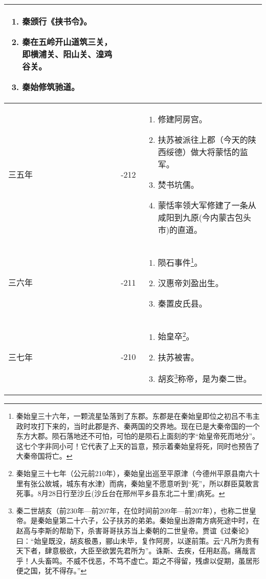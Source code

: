 \begin{longtable}{|>{\centering\scriptsize}m{2em}|>{\centering\scriptsize}m{1.3em}|>{\centering}m{8.8em}|}
\begin{enumerate}
  \item 秦颁行《挟书令》。
  \item 秦在五岭开山道筑三关，即横浦关、阳山关、湟鸡谷关。
  \item 秦始修筑驰道。
  \end{enumerate} \tabularnewline\hline
  三五年 & -212 & \begin{enumerate}
    \tiny
  \item 修建阿房宫。
  \item 扶苏被派往上郡（今天的陕西绥德）做大将蒙恬的监军。
  \item 焚书坑儒。
  \item 蒙恬率领大军修建了一条从咸阳到九原(今内蒙古包头市)的直道。
  \end{enumerate} \tabularnewline\hline
  三六年 & -211 & \begin{enumerate}
    \tiny
  \item 陨石事件\footnote{秦始皇三十六年，一颗流星坠落到了东郡。东郡是在秦始皇即位之初吕不韦主政时攻打下来的，当时此郡是齐、秦两国的交界地。现在已是大秦帝国的一个东方大郡。陨石落地还不可怕，可怕的是陨石上面刻的字“始皇帝死而地分”。这七个字非同小可！它代表了上天的旨意，预示着秦始皇将死，同时也预告了大秦帝国将亡。}。
  \item 汉惠帝刘盈出生。
  \item 秦置皮氏县。
  \end{enumerate} \tabularnewline\hline
  三七年 & -210 & \begin{enumerate}
    \tiny
  \item 始皇卒\footnote{秦始皇三十七年（公元前210年），秦始皇出巡至平原津（今德州平原县南六十里有张公故城，城东有水津）而病，秦始皇不愿意听到“死”，所以群臣莫敢言死事。8月28日行至沙丘(沙丘台在邢州平乡县东北二十里)病死。}。
  \item 扶苏被害。
  \item 胡亥\footnote{秦二世胡亥（前230年—前207年，在位时间前209年—前207年），也称二世皇帝。是秦始皇第二十六子，公子扶苏的弟弟。秦始皇出游南方病死途中时，在赵高与李斯的帮助下，杀害哥哥扶苏当上秦朝的二世皇帝。贾谊《过秦论》曰：“始皇既没，胡亥极愚，郦山未毕，复作阿房，以遂前策。云“凡所为贵有天下者，肆意极欲，大臣至欲罢先君所为”。诛斯、去疾，任用赵高。痛哉言乎！人头畜鸣。不威不伐恶，不笃不虚亡。距之不得留，残虐以促期，虽居形便之国，犹不得存。”}称帝，是为秦二世。
  \end{enumerate} \tabularnewline
  \bottomrule
\end{longtable}


